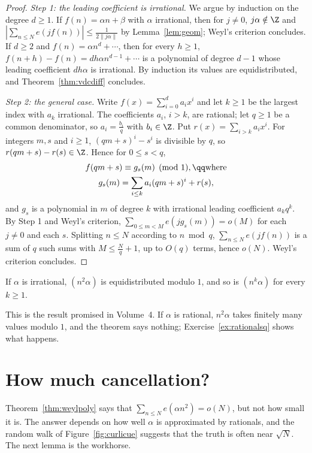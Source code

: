 \begin{proof}
\emph{Step 1: the leading coefficient is irrational.} We argue by induction on the degree $d\ge1$. If $f(n)=\alpha n+\beta$ with $\alpha$ irrational, then for $j\ne0$, $j\alpha\notin\Z$ and $|\sum_{n\le N}e(jf(n))|\le\frac1{2\|j\alpha\|}$
by Lemma~\ref{lem:geom}; Weyl's criterion concludes. If $d\ge2$ and $f(n)=\alpha n^d+\cdots$, then for every $h\ge1$, $f(n+h)-f(n)=d h\alpha n^{d-1}+\cdots$ is a polynomial of degree $d-1$ whose leading coefficient
$dh\alpha$ is irrational. By induction its values are equidistributed, and Theorem~\ref{thm:vdcdiff} concludes.

\emph{Step 2: the general case.} Write $f(x)=\sum_{i=0}^da_ix^i$ and let $k\ge1$ be the largest index with $a_k$ irrational. The coefficients $a_i$, $i>k$, are rational; let $q\ge1$ be a common denominator, so $a_i=\frac{b_i}q$
with $b_i\in\Z$. Put $r(x)=\sum_{i>k}a_ix^i$. For integers $m,s$ and $i\ge1$, $(qm+s)^i-s^i$ is divisible by $q$, so $r(qm+s)-r(s)\in\Z$. Hence for $0\le s<q$,
\[
\begin{gathered}f(qm+s)\equiv g_s(m)\pmod1,\qq\text{where}\\g_s(m)=\sum_{i\le k}a_i(qm+s)^i+r(s),\end{gathered}
\]
and $g_s$ is a polynomial in $m$ of degree $k$ with irrational leading coefficient $a_kq^k$. By Step 1 and Weyl's criterion, $\sum_{0\le m<M}e(jg_s(m))=o(M)$ for each $j\ne0$ and each $s$. Splitting $n\le N$ according to
$n\bmod q$, $\sum_{n\le N}e(jf(n))$ is a sum of $q$ such sums with $M\le\frac Nq+1$, up to $O(q)$ terms, hence $o(N)$. Weyl's criterion concludes.
\end{proof}

\begin{corollary}\label{cor:nsquared}
If $\alpha$ is irrational, $(n^2\alpha)$ is equidistributed modulo $1$, and so is $(n^k\alpha)$ for every $k\ge1$.
\end{corollary}

This is the result promised in Volume~4. If $\alpha$ is rational, $n^2\alpha$ takes finitely many values modulo $1$, and the theorem says nothing; Exercise~\ref{ex:rationalsq} shows what happens.

\section{How much cancellation?}

Theorem~\ref{thm:weylpoly} says that $\sum_{n\le N}e(\alpha n^2)=o(N)$, but not how small it is. The answer depends on how well $\alpha$ is approximated by rationals, and the random walk of
Figure~\ref{fig:curlicue} suggests that the truth is often near $\sqrt N$. The next lemma is the workhorse.

